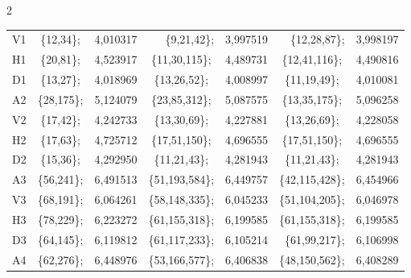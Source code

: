 \begin{multicols}{2}
\begin{table}[b]
\begin{center}
\begin{tabular}{|c|cc|cc|cc|}

V1 & \{12,34\}; &  4,010317 & ~~~\{9,21,42\}; &  3,997519 & ~~\{12,28,87\}; &  3,998197\\


H1 & \{20,81\}; &  4,523917 & \{11,30,115\}; &  4,489731 & \{12,41,116\}; &  4,490816\\


D1 & \{13,27\}; &  4,018969 & \{13,26,52\}; &  4,008997 & \{11,19,49\}; &  4,010081\\


A2 & \{28,175\}; &  5,124079 &\{23,85,312\}; &  5,087575 &\{13,35,175\}; &  5,096258\\


V2 & \{17,42\}; &  4,242733 & \{13,30,69\}; &  4,227881 & \{13,26,69\}; &  4,228058\\


H2 & \{17,63\}; &  4,725712 & \{17,51,150\}; &  4,696555 &\{17,51,150\}; &  4,696555\\


D2 & \{15,36\}; &  4,292950 & \{11,21,43\}; &  4,281943 & \{11,21,43\}; &  4,281943\\


A3 & \{56,241\}; &  6,491513 & \{51,193,584\}; &  6,449757 & \{42,115,428\}; &  6,454966\\


V3 & \{68,191\}; &  6,064261 & \{58,148,335\}; &  6,045233 & \{51,104,205\}; &  6,046978\\


H3 & \{78,229\}; &  6,223272 & \{61,155,318\}; &  6,199585 & \{61,155,318\}; &  6,199585\\


D3 & \{64,145\}; &  6,119812 & \{61,117,233\}; &  6,105214 & ~\{61,99,217\}; &  6,106998\\


A4 & \{62,276\}; &  6,448976 & \{53,166,577\}; &  6,406838 & \{48,150,562\}; &  6,408289\\


\end{tabular}
\end{center}
\end{table}
\end{multicols}
